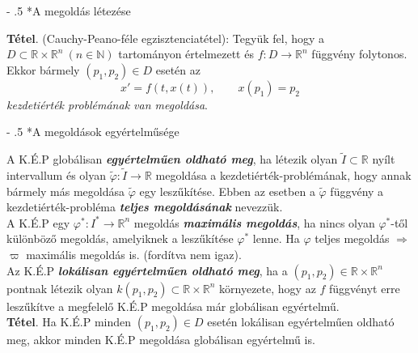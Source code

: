 \documentclass[12pt,margin=0px]{article}
\makeatletter
\renewcommand\paragraph{%
	\@startsection{paragraph}{4}{0mm}%
	{-\baselineskip}%
	{.5\baselineskip}%
	{\normalfont\normalsize\bfseries}}
\makeatother
\begin{document}
    \paragraph*{A megoldás létezése}

    \noindent \textbf{Tétel}. (Cauchy-Peano-féle egzisztenciatétel): Tegyük fel, hogy a $D \subset \mathbb{R} \times \mathbb{R}^{n}\ (n \in \mathbb{N})$ tartományon értelmezett és $f:D \to \mathbb{R}^{n}$ függvény folytonos. Ekkor bármely $(p_1, p_2) \in D$ esetén az
    \[
        x' = f(t, x(t)), \qquad x(p_1) = p_2
    \]
    \emph{kezdetiérték problémának van megoldása}.

    \paragraph*{A megoldások egyértelműsége}

    \noindent A K.É.P globálisan \textbf{\emph{egyértelműen oldható meg}}, ha létezik olyan $\tilde{I} \subset \mathbb{R}$ nyílt intervallum és olyan $\tilde{\varphi}: \tilde{I} \to \mathbb{R}$ megoldása a kezdetiérték-problémának, hogy annak bármely más megoldása $\tilde{\varphi}$ egy leszűkítése. Ebben az esetben a $\tilde{\varphi}$ függvény a kezdetiérték-probléma \textbf{\emph{teljes megoldásának}} nevezzük.\\

    \noindent A K.É.P egy $\varphi^{*}: I^{*} \to \mathbb{R}^{n}$ megoldás \textbf{\emph{maximális megoldás}}, ha nincs olyan $\varphi^{*}$-től különböző megoldás, amelyiknek a leszűkítése $\varphi^{*}$ lenne. Ha $\varphi$ teljes megoldás $\Rightarrow$ $\varpi$ maximális megoldás is. (fordítva nem igaz).\\
\newpage
    \noindent Az K.É.P \textbf{\emph{lokálisan egyértelműen oldható meg}}, ha a $(p_1, p_2) \in \mathbb{R} \times \mathbb{R}^{n}$  pontnak létezik olyan $k(p_1, p_2) \subset \mathbb{R} \times \mathbb{R}^{n}$ környezete, hogy az $f$ függvényt erre leszűkítve a megfelelő K.É.P megoldása már globálisan egyértelmű.\\

    \noindent \textbf{Tétel}. Ha K.É.P minden $(p_1, p_2) \in D$ esetén lokálisan egyértelműen oldható meg, akkor minden K.É.P megoldása globálisan egyértelmű is.\\
\end{document}
